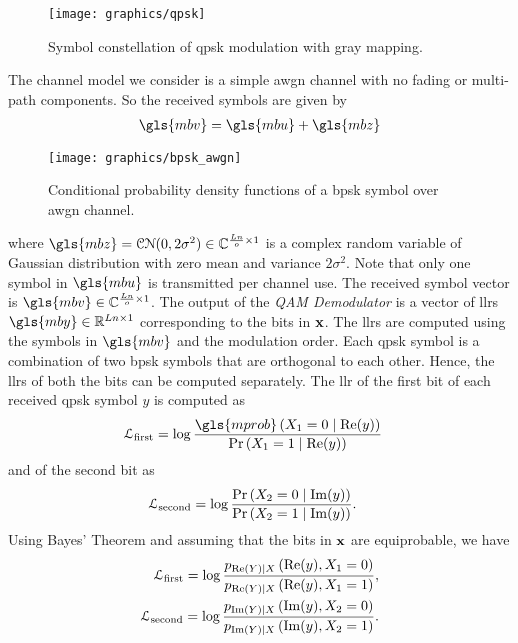 \begin{figure}[htbp]
  \centering
  \texttt{[image: graphics/qpsk]}
  \caption[\acrshort{qpsk} constellation.]{Symbol constellation of \gls{qpsk} modulation with gray mapping.}
  \label{fig:qpsk}
\end{figure}

The channel model we consider is a simple \gls{awgn} channel with no fading or multi-path components. So the received symbols are given by \begin{align}\gls{mbv}=\gls{mbu}+\gls{mbz}\end{align}
\begin{figure}[htbp]
  \centering
  \texttt{[image: graphics/bpsk\_awgn]}
  \caption[Conditional probability density functions of \acrshort{bpsk}.]{Conditional probability density functions of a \gls{bpsk} symbol over \gls{awgn} channel.}
  \label{fig:bpsk_awgn}
\end{figure}
where $\gls{mbz}=\mathcal{CN}(0,2\sigma^2)\in\mathbb{C}^{\frac{Ln}{o}\times 1}$ is a complex random variable of Gaussian distribution with zero mean and variance $2\sigma^2$. Note that only one symbol in $\gls{mbu}$ is transmitted per channel use. The received symbol vector is $\gls{mbv}\in\mathbb{C}^{\frac{Ln}{o}\times 1}$. The output of the \emph{QAM Demodulator} is a vector of \glspl{llr} $\gls{mby}\in\mathbb{R}^{Ln\times 1}$ corresponding to the bits in $\mathbf{x}$. The \glspl{llr} are computed using the symbols in $\gls{mbv}$ and the modulation order. Each \gls{qpsk} symbol is a combination of two \gls{bpsk} symbols that are orthogonal to each other. Hence, the \glspl{llr} of both the bits can be computed separately. The \gls{llr} of the first bit of each received \gls{qpsk} symbol $y$ is computed as
\begin{align}
\mathcal{L}_{\text{first}}&=\log\frac{\gls{mprob}\left(X_1=0\mid\re(y)\right)}{\prob\left(X_1=1\mid\re(y)\right)}
\end{align}
and of the second bit as
\begin{align}
\mathcal{L}_{\text{second}}&=\log\frac{\text{Pr}\left(X_2=0\mid\operatorname{Im}(y)\right)}{\text{Pr}\left(X_2=1\mid\operatorname{Im}(y)\right)}.
\end{align}
Using Bayes' Theorem and assuming that the bits in $\mathbf{x}$ are equiprobable, we have
\begin{align}
\mathcal{L}_{\text{first}}=\log\frac{p_{\operatorname{Re}(Y)\mid X}\left(\operatorname{Re}(y), X_1=0\right)}{p_{\operatorname{Re}(Y)\mid X}\left(\operatorname{Re}(y), X_1=1\right)},\\
\mathcal{L}_{\text{second}}=\log\frac{p_{\operatorname{Im}(Y)\mid X}\left(\operatorname{Im}(y), X_2=0\right)}{p_{\operatorname{Im}(Y)\mid X}\left(\operatorname{Im}(y), X_2=1\right)}.
\end{align}
